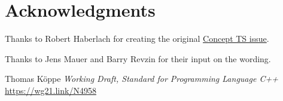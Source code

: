 \documentclass{wg21}
\begin{document}
\section{Acknowledgments}

Thanks to Robert Haberlach for creating the original  \href{http://cplusplus.github.io/concepts-ts/ts-active.html#28}{Concept TS issue}.

Thanks to Jens Mauer and Barry Revzin for their input on the wording.





\renewcommand{\section}[2]{}%

\begin{thebibliography}{9}

Thomas Köppe
\emph{Working Draft, Standard for Programming Language C++}\newline
\url{https://wg21.link/N4958}


\end{thebibliography}
\end{document}
